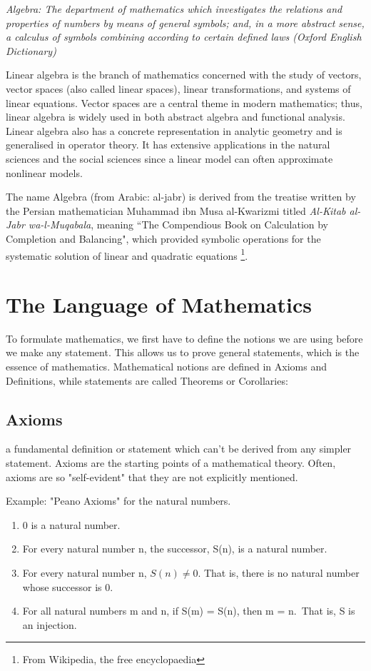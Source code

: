 \documentclass[
  a4paper,
  DIV=11,
  numbers=noendperiod,
  oneside]{scrreprt}
\theoremstyle{definition}
\theoremstyle{remark}
\begin{document}
\emph{Algebra: The department of mathematics which investigates the
relations and properties of numbers by means of general symbols; and, in
a more abstract sense, a calculus of symbols combining according to
certain defined laws (Oxford English Dictionary)}

Linear algebra is the branch of mathematics concerned with the study of
vectors, vector spaces (also called linear spaces), linear
transformations, and systems of linear equations. Vector spaces are a
central theme in modern mathematics; thus, linear algebra is widely used
in both abstract algebra and functional analysis. Linear algebra also
has a concrete representation in analytic geometry and is generalised in
operator theory. It has extensive applications in the natural sciences
and the social sciences since a linear model can often approximate
nonlinear models.

The name Algebra (from Arabic: al-jabr) is derived from the treatise
written by the Persian mathematician Muhammad ibn Musa al-Kwarizmi
titled \emph{Al-Kitab al-Jabr wa-l-Muqabala}, meaning ``The Compendious
Book on Calculation by Completion and Balancing", which provided
symbolic operations for the systematic solution of linear and quadratic
equations \footnote{From Wikipedia, the free encyclopaedia}.

\section{The Language of Mathematics}\label{the-language-of-mathematics}

To formulate mathematics, we first have to define the notions we are
using before we make any statement. This allows us to prove general
statements, which is the essence of mathematics. Mathematical notions
are defined in Axioms and Definitions, while statements are called
Theorems or Corollaries:

\subsection{Axioms}\label{axioms}

a fundamental definition or statement which can't be derived from any
simpler statement. Axioms are the starting points of a mathematical
theory. Often, axioms are so "self-evident" that they are not explicitly
mentioned.

Example: "Peano Axioms" for the natural numbers.

\begin{enumerate}
\def\labelenumi{\arabic{enumi}.}
\item
  0 is a natural number.
\item
  For every natural number n, the successor, S(n), is a natural number.
\item
  For every natural number n, \(S(n) \neq 0\). That is, there is no
  natural number whose successor is 0.
\item
  For all natural numbers m and n, if S(m) = S(n), then m = n.~That is,
  S is an injection.
\end{enumerate}
\end{document}
